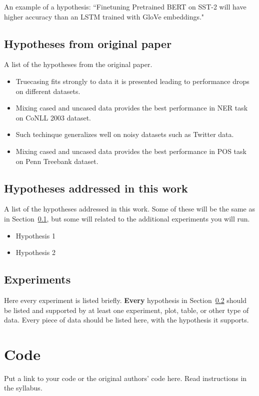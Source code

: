 \documentclass[11pt,a4paper]{article}
\begin{document}
An example of a hypothesis: 
``Finetuning Pretrained BERT on SST-2 will have higher accuracy than an LSTM trained with GloVe embeddings."


\subsection{Hypotheses from original paper}
\label{sec:original_hypotheses}
A list of the hypotheses from the original paper.
\begin{itemize}
    \item Truecasing fits strongly to data it is presented leading to performance drops on different datasets.
    \item Mixing cased and uncased data provides the best performance in NER task on CoNLL 2003 dataset.
    \item Such techinque generalizes well on noisy datasets such as Twitter data.
    \item Mixing cased and uncased data provides the best performance in POS task on Penn Treebank dataset.
\end{itemize}

\subsection{Hypotheses addressed in this work}
\label{sec:current_hypotheses}
A list of the hypotheses addressed in this work. Some of these will be the same as in Section~\ref{sec:original_hypotheses}, but some will related to the additional experiments you will run.


\begin{itemize}
    \item Hypothesis 1
    \item Hypothesis 2
\end{itemize}


\subsection{Experiments}
Here every experiment is listed briefly.
\textbf{Every} hypothesis in Section~\ref{sec:current_hypotheses} should be listed and supported by at least one experiment, plot, table, or other type of data. 
Every piece of data should be listed here, with the hypothesis it supports.

\section{Code}
Put a link to your code or the original authors' code here. Read instructions in the syllabus.
\end{document}
